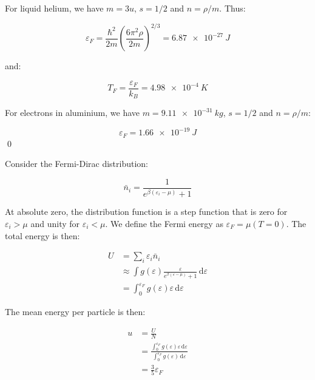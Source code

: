 \documentclass[12pt]{article}
\begin{document}
For liquid helium, we have $m = 3u$, $s = 1/2$ and $n = \rho/m$. Thus:

\begin{equation}
    \varepsilon_{F} = \frac{\hbar^{2}}{2m} \left( \frac{6\pi^{2} \rho}{2m} \right)^{2/3} = \qty{6.87e-27}{J}
\end{equation}

and:

\begin{equation}
    T_{F} = \frac{\varepsilon_{F}}{k_{B}} = \qty{4.98e-4}{K}
\end{equation}

For electrons in aluminium, we have $m = \qty{9.11e-31}{kg}$, $s = 1/2$ and $n = \rho/m$:

\begin{equation}
    \varepsilon_{F} = \qty{1.66e-19}{J}
\end{equation}
\qed



Consider the Fermi-Dirac distribution:

\begin{equation}
    \bar{n}_{i} = \frac{1}{e^{\beta (\varepsilon_{i} - \mu)} + 1}
\end{equation}

At absolute zero, the distribution function is a step function that is zero for $\varepsilon_{i} > \mu$ and unity for $\varepsilon_{i} < \mu$. We define the Fermi energy as $\varepsilon_{F} = \mu(T = 0)$. The total energy is then:

\begin{equation}
    \begin{split}
        U &= \sum_{i} \varepsilon_{i} \bar{n}_{i} \\
        &\approx \int g(\varepsilon) \frac{\varepsilon}{e^{\beta (\varepsilon - \mu)} + 1} \, \mathrm{d}\varepsilon \\
        &= \int_{0}^{\varepsilon_{F}} g(\varepsilon) \varepsilon \, \mathrm{d}\varepsilon
    \end{split}
\end{equation}

The mean energy per particle is then:

\begin{equation}
    \begin{split}
        u &= \frac{U}{N} \\
        &= \frac{\int_{0}^{\varepsilon_{F}} g(\varepsilon) \varepsilon \, \mathrm{d}\varepsilon}{\int_{0}^{\varepsilon_{F}} g(\varepsilon) \, \mathrm{d}\varepsilon} \\
        &= \frac{3}{5} \varepsilon_{F}
    \end{split}
\end{equation}
\end{document}
